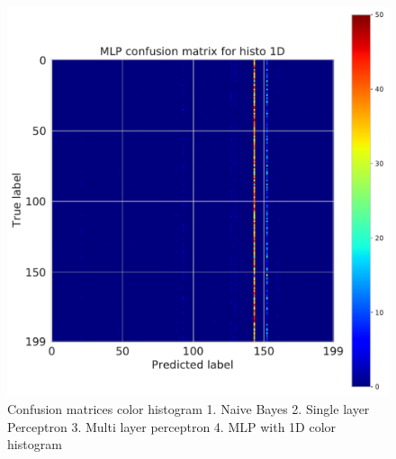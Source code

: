 \documentclass[11pt]{article}
\begin{document}
\begin{figure}[H]
\begin{minipage}[c]{0.5\textwidth}
\end{minipage}
\begin{minipage}[c]{0.5\textwidth}
\includegraphics[width=1\linewidth]{figures/Tiny_Image/CM__MLP_histo_1D.pdf}
\end{minipage}
\caption{Confusion matrices color histogram 1. Naive Bayes 2. Single layer Perceptron 3. Multi layer perceptron 4. MLP with 1D color histogram}
\label{CV_Matrices_Tiny_Image_color_hist}
\end{figure}
\end{document}
